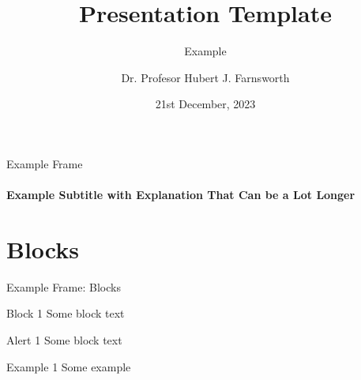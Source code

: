 \documentclass[aspectratio=43]{beamer}
\title{Presentation Template}
\subtitle{Example}
\author[H. J. F.]{Dr. Profesor Hubert J. Farnsworth}
\institute{West University of Timișoara}
\date{21st December, 2023}
\begin{document}
\titleframe

\begin{frame}{Example Frame}
\framesubtitle{Example Subtitle with Explanation That Can be a Lot Longer}
\end{frame}

\section{Blocks}

\begin{frame}{Example Frame: Blocks}
\begin{block}{Block 1}
Some block text
\end{block}

\begin{alertblock}{Alert 1}
Some block text
\end{alertblock}

\begin{exampleblock}{Example 1}
Some example
\end{exampleblock}
\end{frame}
\end{document}
